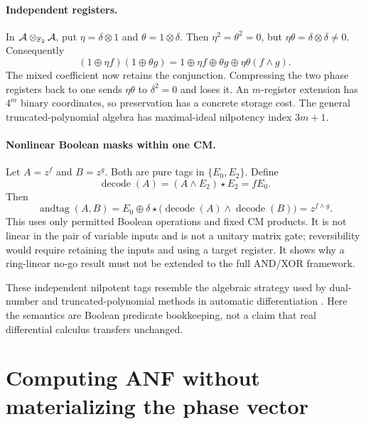 \paragraph{Independent registers.}
In $\mathcal A\otimes_{\mathbb F_2}\mathcal A$, put $\eta=\delta\otimes1$ and $\theta=1\otimes\delta$. Then $\eta^2=\theta^2=0$, but $\eta\theta=\delta\otimes\delta\ne0$. Consequently
\begin{equation}\label{eq:independent}
 (1\oplus\eta f)(1\oplus\theta g)
 =1\oplus\eta f\oplus\theta g\oplus\eta\theta(f\land g).
\end{equation}
The mixed coefficient now retains the conjunction. Compressing the two phase registers back to one sends $\eta\theta$ to $\delta^2=0$ and loses it. An $m$-register extension has $4^m$ binary coordinates, so preservation has a concrete storage cost. The general truncated-polynomial algebra has maximal-ideal nilpotency index $3m+1$.

\paragraph{Nonlinear Boolean masks within one CM.}
Let $A=z^f$ and $B=z^g$. Both are pure tags in $\{E_0,E_2\}$. Define
\begin{equation}
 \operatorname{decode}(A)=(A\land E_2)\star E_2=fE_0.
\end{equation}
Then
\begin{equation}\label{eq:tagand}
 \operatorname{andtag}(A,B)=E_0\oplus\delta\star
 \big(\operatorname{decode}(A)\land\operatorname{decode}(B)\big)
 =z^{f\land g}.
\end{equation}
This uses only permitted Boolean operations and fixed CM products. It is not linear in the pair of variable inputs and is not a unitary matrix gate; reversibility would require retaining the inputs and using a target register. It shows why a ring-linear no-go result must not be extended to the full AND/XOR framework.

These independent nilpotent tags resemble the algebraic strategy used by dual-number and truncated-polynomial methods in automatic differentiation \cite{ad}. Here the semantics are Boolean predicate bookkeeping, not a claim that real differential calculus transfers unchanged.

\section{Computing ANF without materializing the phase vector}\label{sec:compiler}
